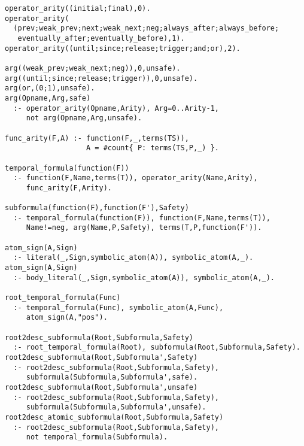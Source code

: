 \begin{center}
\begin{minipage}{\linewidth}
  \begin{lstlisting}[]
operator_arity((initial;final),0).
operator_arity(
  (prev;weak_prev;next;weak_next;neg;always_after;always_before;
   eventually_after;eventually_before),1).
operator_arity((until;since;release;trigger;and;or),2).

arg((weak_prev;weak_next;neg)),0,unsafe).
arg((until;since;release;trigger)),0,unsafe).
arg(or,(0;1),unsafe).
arg(Opname,Arg,safe)
  :- operator_arity(Opname,Arity), Arg=0..Arity-1, 
     not arg(Opname,Arg,unsafe).

func_arity(F,A) :- function(F,_,terms(TS)), 
                   A = #count{ P: terms(TS,P,_) }.

temporal_formula(function(F))
  :- function(F,Name,terms(T)), operator_arity(Name,Arity), 
     func_arity(F,Arity).

subformula(function(F),function(F'),Safety)
  :- temporal_formula(function(F)), function(F,Name,terms(T)), 
     Name!=neg, arg(Name,P,Safety), terms(T,P,function(F')).

atom_sign(A,Sign)
  :- literal(_,Sign,symbolic_atom(A)), symbolic_atom(A,_).
atom_sign(A,Sign)
  :- body_literal(_,Sign,symbolic_atom(A)), symbolic_atom(A,_).

root_temporal_formula(Func)
  :- temporal_formula(Func), symbolic_atom(A,Func), 
     atom_sign(A,"pos").

root2desc_subformula(Root,Subformula,Safety)
  :- root_temporal_formula(Root), subformula(Root,Subformula,Safety).
root2desc_subformula(Root,Subformula',Safety)
  :- root2desc_subformula(Root,Subformula,Safety), 
     subformula(Subformula,Subformula',safe).
root2desc_subformula(Root,Subformula',unsafe)
  :- root2desc_subformula(Root,Subformula,Safety), 
     subformula(Subformula,Subformula',unsafe).
root2desc_atomic_subformula(Root,Subformula,Safety)
  :- root2desc_subformula(Root,Subformula,Safety), 
     not temporal_formula(Subformula).

\end{lstlisting}
\end{minipage}
\end{center}


